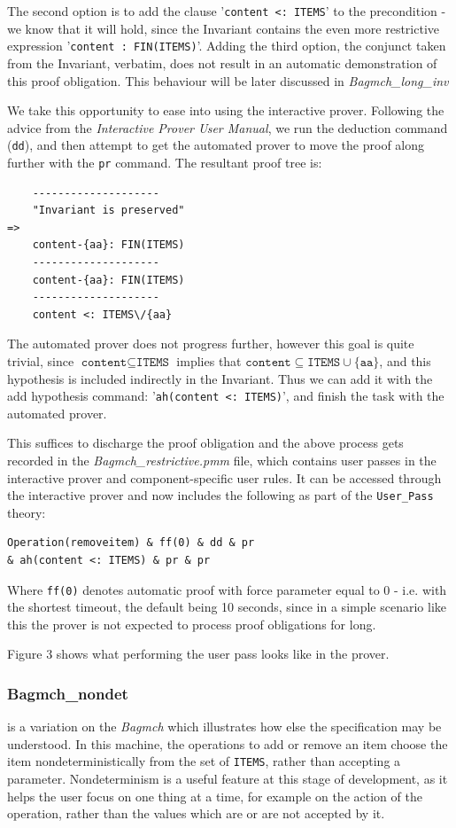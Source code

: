 \documentclass[11pt,journal]{IEEEtran}
\begin{document}
	The second option is to add the clause '\texttt{content <: ITEMS}' to the precondition - we know that it will hold, since the Invariant contains the even more restrictive expression '\texttt{content :  FIN(ITEMS)}'. Adding the third option, the conjunct taken from the Invariant, verbatim, does not result in an automatic demonstration of this proof obligation. This behaviour will be later discussed in \emph{Bagmch\_long\_inv}

	
	We take this opportunity to ease into using the interactive prover. Following the advice from the \emph{Interactive Prover User Manual}, we run the deduction command (\texttt{dd}), and then attempt to get the automated prover to move the proof along further with the \texttt{pr} command. The resultant proof tree is:
	
	\begin{lstlisting}
	--------------------
	"Invariant is preserved" 
=> 
	content-{aa}: FIN(ITEMS) 
	--------------------
	content-{aa}: FIN(ITEMS) 
	--------------------
	content <: ITEMS\/{aa} 
	\end{lstlisting}
	
	The automated prover does not progress further, however this goal is quite trivial, since $\texttt{content} \subseteq \texttt{ITEMS}$ implies that $\texttt{content} \subseteq \texttt{ITEMS} \cup \{\texttt{aa}\}$, and this hypothesis is included indirectly in the Invariant. Thus we can add it with the add hypothesis command: '\texttt{ah(content <: ITEMS)}', and finish the task with the automated prover. 
	
	This suffices to discharge the proof obligation and the above process gets recorded in the \emph{Bagmch\_restrictive.pmm} file, which contains user passes in the interactive prover and component-specific user rules. It can be accessed through the interactive prover and now includes the following as part of the \texttt{User\_Pass} theory:
	
	\begin{lstlisting}
Operation(removeitem) & ff(0) & dd & pr 
& ah(content <: ITEMS) & pr & pr
	\end{lstlisting}
	Where \texttt{ff(0)} denotes automatic proof with force parameter equal to 0 - i.e. with the shortest timeout, the default being 10 seconds, since in a simple scenario like this the prover is not expected to process proof obligations for long. 
	
	Figure 3 shows what performing the user pass looks like in the prover.
	
	\subsubsection{Bagmch\_nondet} is a variation on the \emph{Bagmch} which illustrates how else the specification may be understood. In this machine, the operations to add or remove an item choose the item nondeterministically from the set of \texttt{ITEMS}, rather than accepting a parameter. Nondeterminism is a useful feature at this stage of development, as it helps the user focus on one thing at a time, for example on the action of the operation, rather than the values which are or are not accepted by it.
\end{document}
